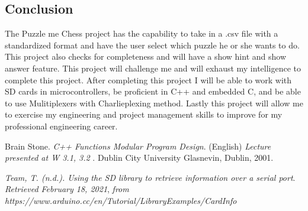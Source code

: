 \documentclass[11pt]{article}
\begin{document}
\newpage

\subsection{Conclusion}
The Puzzle me Chess project has the capability to take in a .csv file with a standardized format and have the user select which puzzle he or she wants to do. This project also checks for completeness and will have a show hint and show answer feature. This project will challenge me and will exhaust my intelligence to complete this project. After completing this project I will be able to work with SD cards in microcontrollers, be proficient in C++ and embedded C, and be able to use Mulitiplexers with Charlieplexing method. Lastly this project will allow me to exercise my engineering and project management skills to improve for my professional engineering career. 


\begin{thebibliography}{2}
Brain Stone. 
\textit{C++ Functions Modular Program Design}. (English) 
\textit{ Lecture presented at W 3.1, 3.2 }. 
Dublin City University Glasnevin, Dublin, 2001.

\textit{Team, T. (n.d.). Using the SD library to retrieve information over a serial port}.
\textit{ Retrieved February 18, 2021}, 
\textit{from https://www.arduino.cc/en/Tutorial/LibraryExamples/CardInfo}
\end{thebibliography}
\end{document}
